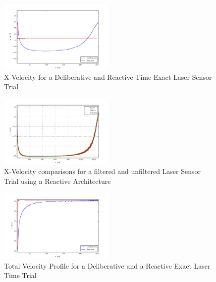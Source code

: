 \documentclass[journal, 10pt]{IEEEtran}
\begin{document}
\begin{figure}[tb]
\begin{center}
\includegraphics[width=0.5\textwidth]{figures/xVelocityClean.pdf}
\caption{X-Velocity for a Deliberative and Reactive Time Exact Laser Sensor Trial }
\label{xClean_velocity}
\end{center}
\end{figure}

\begin{figure}[tb]
\begin{center}
\includegraphics[width=0.5\textwidth]{figures/reactivelaservx.pdf}
\caption{X-Velocity comparisons for a filtered and unfiltered Laser Sensor Trial using a Reactive Architecture }
\label{xNoise_velocity}
\end{center}
\end{figure}

\begin{figure}[tb]
\begin{center}
\includegraphics[width=0.5\textwidth]{figures/TotalVelocityClean.pdf}
\caption{Total Velocity Profile for a Deliberative and a Reactive Exact Laser Time Trial }
\label{clean_total}
\end{center}
\end{figure}
\end{document}
